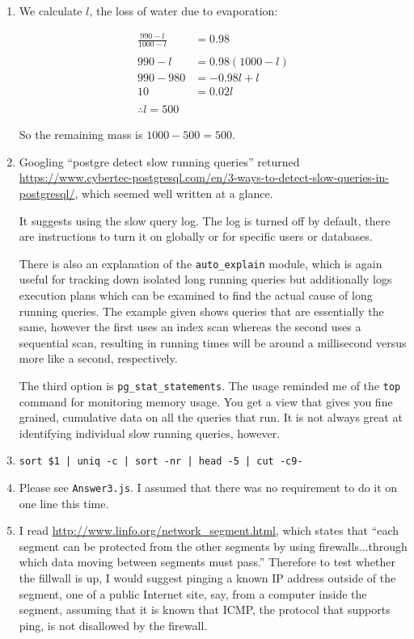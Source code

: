 \documentclass{article}
\begin{document}
\begin{enumerate}[start=0]
\item We calculate $l$, the loss of water due to evaporation:

\begin{align*}
\frac{990-l}{1000-l} & = 0.98 \\
\\
990 - l & = 0.98(1000-l) \\
990 - 980 & = -0.98l + l \\
10 & = 0.02l\\
\\
\therefore l = 500
\end{align*}

So the remaining mass is $1000 - 500 = 500$.

\item Googling ``postgre detect slow running queries'' returned \url{https://www.cybertec-postgresql.com/en/3-ways-to-detect-slow-queries-in-postgresql/}, which seemed well written at a glance. 

It suggests using the slow query log. The log is turned off by default, there are instructions to turn it on globally or for specific users or databases. 

There is also an explanation of the \texttt{auto\_explain} module, which is again useful for tracking down isolated long running queries but additionally logs execution plans which can be examined to find the actual cause of long running queries. The example given shows queries that are essentially the same, however the first uses an index scan whereas the second uses a sequential scan, resulting in running times will be around a millisecond versus more like a second, respectively.

The third option is \texttt{pg\_stat\_statements}. The usage reminded me of the \texttt{top} command for monitoring memory usage. You get a view that gives you fine grained, cumulative data on all the queries that run. It is not always great at identifying individual slow running queries, however.

\item \texttt{sort \$1 | uniq -c | sort -nr | head -5 | cut -c9-}

\item Please see \texttt{Answer3.js}. I assumed that there was no requirement to do it on one line this time.

\item I read \url{http://www.linfo.org/network_segment.html}, which states that ``each segment can be protected from the other segments by using firewalls...through which data moving between segments must pass.'' Therefore to test whether the fillwall is up, I would suggest pinging a known IP address outside of the segment, one of a public Internet site, say, from a computer inside the segment, assuming that it is known that ICMP, the protocol that supports ping, is not disallowed by the firewall.


\end{enumerate}
\end{document}
